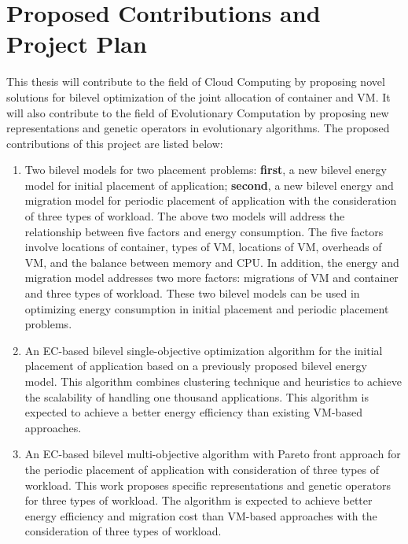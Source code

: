 \chapter{Proposed Contributions and Project Plan}\label{C:con}

This thesis will contribute to the field of Cloud Computing by proposing novel solutions for bilevel optimization of the joint allocation of container and VM. It will also contribute to the field of Evolutionary Computation by proposing new representations and genetic operators in evolutionary algorithms. The proposed contributions of this project are listed below:
 
\begin{enumerate}
	\item Two bilevel models for two placement problems: \textbf{first}, a new bilevel energy model for initial placement of application; \textbf{second}, a new bilevel energy and migration model for periodic placement of application with the consideration of three types of workload. The above two models will address the relationship between five factors and energy consumption. The five factors involve locations of container, types of VM, locations of VM, overheads of VM, and the balance between memory and CPU. In addition, the energy and migration model addresses two more factors: migrations of VM and container and three types of workload. These two bilevel models can be used in optimizing energy consumption in initial placement and periodic placement problems.

	\item An EC-based bilevel single-objective optimization algorithm for the initial placement of application based on a previously proposed bilevel energy model. This algorithm combines clustering technique and heuristics to achieve the scalability of handling one thousand applications. This algorithm is expected to achieve a better energy efficiency than existing VM-based approaches.

	\item An EC-based bilevel multi-objective algorithm with Pareto front approach for the periodic placement of application with consideration of three types of workload. 
	This work proposes specific representations and genetic operators for three types of workload. The algorithm is expected to achieve better energy efficiency and migration cost than VM-based approaches with the consideration of three types of workload. 


\end{enumerate}

